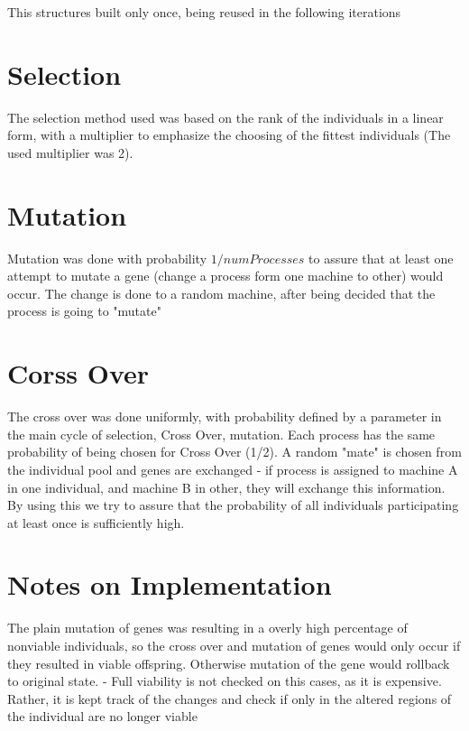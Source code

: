 \documentclass[a4paper,10pt]{article}
\begin{document}
This structures built only once, being reused in the following iterations
 
\section{Selection}
The selection method used was based on the rank of the individuals in a linear form, with a multiplier to emphasize the choosing of the fittest individuals (The used multiplier was 2).

\section{Mutation}
Mutation was done with probability $1/numProcesses$ to assure that at least one attempt to mutate a gene (change a process form one machine to other) would occur. The change is done to a random machine, after being decided that the process is going to "mutate"

\section{Corss Over}
The cross over was done uniformly, with probability defined by a parameter in the main cycle of selection, Cross Over, mutation. Each process has the same probability of being chosen for Cross Over (1/2). A random "mate" is chosen from the individual pool and genes are exchanged - if process is assigned to machine A in one individual, and machine B in other, they will exchange this information. 
\\ By using this we try to assure that the probability of all individuals participating at least once is sufficiently high.

\section{ Notes on Implementation}
The plain mutation of genes was resulting in a overly high percentage of nonviable individuals, so the cross over and mutation of genes would only occur if they resulted in viable offspring. Otherwise mutation of the gene would rollback to original state. - Full viability is not checked on this cases, as it is expensive. Rather, it is kept track of the changes and check if only in the altered regions of the individual are no longer viable  
\end{document}
